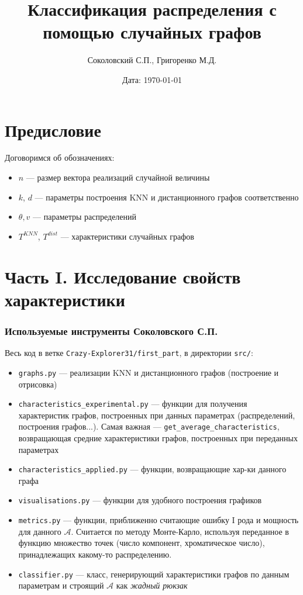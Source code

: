 \documentclass[a4paper,12pt]{article}
\title{\textbf{Классификация распределения с помощью случайных графов}}
\author{Соколовский С.П., Григоренко М.Д.}
\date{Дата: \today}
\begin{document}
\maketitle

\section{Предисловие}
Договоримся об обозначениях: \begin{itemize}
    \item $n$ --- размер вектора реализаций случайной величины
    \item $k$, $d$ --- параметры построения KNN и дистанционного графов соответственно
    \item $\theta, v$ --- параметры распределений
    \item $T^{KNN}$, $T^{dist}$ --- характеристики случайных графов
\end{itemize}

\section{Часть I. Исследование свойств характеристики}
\subsubsection*{Используемые инструменты Соколовского С.П.}
Весь код в ветке \texttt{Crazy-Explorer31/first\_part}, в директории \texttt{src/}:
\begin{itemize}
    \item \texttt{graphs.py} --- реализации KNN и дистанционного графов (построение и отрисовка)
    \item \texttt{characteristics\_experimental.py} --- функции для получения характеристик графов, построенных при данных параметрах (распределений, построения графов...). Самая важная --- \texttt{get\_average\_characteristics}, возвращающая средние характеристики графов, построенных при переданных параметрах
    \item \texttt{characteristics\_applied.py} --- функции, возвращающие хар-ки данного графа
    \item \texttt{visualisations.py} --- функции для удобного построения графиков
    \item \texttt{metrics.py} --- функции, приближенно считающие ошибку I рода и мощность для данного $\mathcal{A}$. Считается по методу Монте-Карло, используя переданное в функцию множество точек (число компонент, хроматическое число), принадлежащих какому-то распределению.
    \item \texttt{classifier.py} --- класс, генерирующий характеристики графов по данным параметрам и строящий $\mathcal{A}$ как \textit{жадный рюкзак}
\end{itemize}
\end{document}
